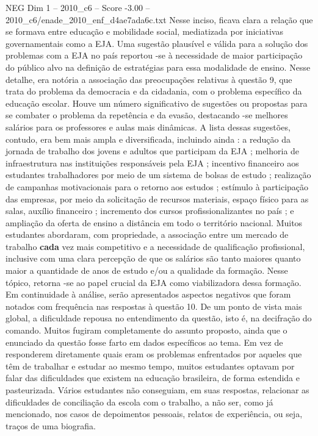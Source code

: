 \begin{textsample}{NEG Dim 1 – 2010\_c6 – Score -3.00 – 2010\_c6/enade\_2010\_enf\_d4ae7ada6c.txt}
Nesse inciso, ficava clara a relação que se formava entre educação e mobilidade social, mediatizada por iniciativas governamentais como a EJA.
Uma sugestão plausível e válida para a solução dos problemas com a EJA no país reportou -se à necessidade de maior participação do público alvo na definição de estratégias para essa modalidade de ensino.
Nesse detalhe, era notória a associação das preocupações relativas à questão 9, que trata do problema da democracia e da cidadania, com o problema específico da educação escolar.
Houve um número significativo de sugestões ou propostas para se combater o problema da repetência e da evasão, destacando -se melhores salários para os professores e aulas mais dinâmicas.
A lista dessas sugestões, contudo, era bem mais ampla e diversificada, incluindo ainda : a redução da jornada de trabalho dos jovens e adultos que participam da EJA ; melhoria de infraestrutura nas instituições responsáveis pela EJA ; incentivo financeiro aos estudantes trabalhadores por meio de um sistema de bolsas de estudo ; realização de campanhas motivacionais para o retorno aos estudos ; estímulo à participação das empresas, por meio da solicitação de recursos materiais, espaço físico para as salas, auxílio financeiro ; incremento dos cursos profissionalizantes no país ; e ampliação da oferta de ensino a distância em todo o território nacional.
Muitos estudantes abordaram, com propriedade, a associação entre um mercado de trabalho \textbf{cada} vez mais competitivo e a necessidade de qualificação profissional, inclusive com uma clara percepção de que os salários são tanto maiores quanto maior a quantidade de anos de estudo e/ou a qualidade da formação.
Nesse tópico, retorna -se ao papel crucial da EJA como viabilizadora dessa formação.
Em continuidade à análise, serão apresentados aspectos negativos que foram notados com frequência nas respostas à questão 10.
De um ponto de vista mais global, a dificuldade repousa no entendimento da questão, isto é, na decifração do comando.
Muitos fugiram completamente do assunto proposto, ainda que o enunciado da questão fosse farto em dados específicos ao tema.
Em vez de responderem diretamente quais eram os problemas enfrentados por aqueles que têm de trabalhar e estudar ao mesmo tempo, muitos estudantes optavam por falar das dificuldades que existem na educação brasileira, de forma estendida e pasteurizada.
Vários estudantes não conseguiam, em suas respostas, relacionar as dificuldades de conciliação da escola com o trabalho, a não ser, como já mencionado, nos casos de depoimentos pessoais, relatos de experiência, ou seja, traços de uma biografia.

\end{textsample}
